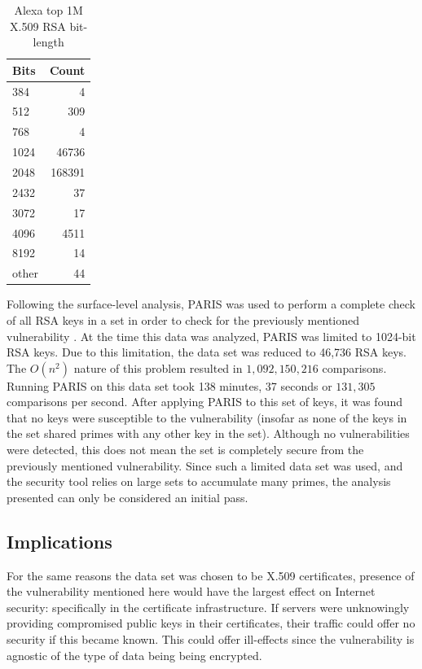 \documentclass[smallextended]{svjour3}       %
\begin{document}
\begin{table}
\centering
\caption{Alexa top 1M X.509 RSA bit-length\label{tab:bits}}
\begin{tabular}{|l|r|}\hline
\textbf{Bits} & \textbf{Count}\\\hline
384 & 4 \\ \hline
512 & 309 \\ \hline
768 & 4 \\ \hline
1024 & 46736 \\ \hline
2048 & 168391 \\ \hline
2432 & 37 \\ \hline
3072 & 17 \\ \hline
4096 & 4511 \\ \hline
8192 & 14 \\ \hline
other & 44 \\ \hline
\end{tabular}
\end{table}

Following the surface-level analysis, PARIS was used to perform a complete
check of all RSA keys in a set in order to check for the previously mentioned
vulnerability \citep{lenstra2012ron}. At the time this data was analyzed, PARIS
was limited to 1024-bit RSA keys. Due to this limitation, the data set was
reduced to 46,736 RSA keys. The $O(n^2)$ nature of this problem resulted in
$1,092,150,216$ comparisons. Running PARIS on this data set took 138 minutes,
37 seconds or $131,305$ comparisons per second.  After applying PARIS to this
set of keys, it was found that no keys were susceptible to the vulnerability
(insofar as none of the keys in the set shared primes with any other key in the
set). Although no vulnerabilities were detected, this does not mean the set is
completely secure from the previously mentioned vulnerability. Since such a
limited data set was used, and the security tool relies on large sets to
accumulate many primes, the analysis presented can only be considered an
initial pass.  

\subsection{Implications}
\label{subsec:implications}
For the same reasons the data set was chosen to be X.509 certificates, presence
of the vulnerability mentioned here would have the largest effect on Internet
security: specifically in the certificate infrastructure. If servers were
unknowingly providing compromised public keys in their certificates, their
traffic could offer no security if this became known. This could offer
ill-effects since the vulnerability is agnostic of the type of data being
being encrypted.
\end{document}
